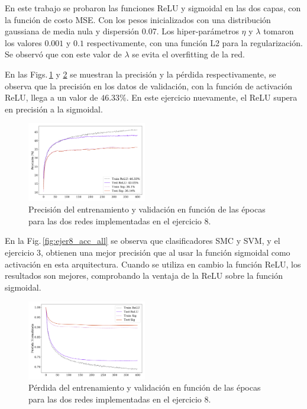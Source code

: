 En este trabajo se probaron las funciones ReLU y sigmoidal en las dos capas, con la función de costo MSE.  Con los pesos inicializados con una distribución gaussiana de media nula y dispersión 0.07. Los hiper-parámetros $\eta$ y $\lambda$ tomaron los valores $0.001$ y $0.1$ respectivamente, con una función L2 para la regularización. Se observó que con este valor de  $\lambda$ se evita el overfitting de la red.

En las Figs.\,\ref{fig:ejer8_acc}  y \ref{fig:ejer8_loss} se muestran la precisión y la pérdida respectivamente, se observa que la precisión en los datos de validación,   con la función de activación ReLU, llega a un valor de $46.33\%$. En este ejercicio nuevamente, el ReLU supera en precisión a la sigmoidal.


\begin{figure}[H]
    \begin{small}
        \begin{center}
            \includegraphics[width=0.465\textwidth]{Graphs/ejer8_acc.pdf}
        \end{center}
        \caption{Precisión del entrenamiento y validación en función de las épocas para las dos redes implementadas en el ejercicio 8.}
        \label{fig:ejer8_acc}
    \end{small}
\end{figure}

En la Fig.\,\ref{fig:ejer8_acc_all} se observa que clasificadores  SMC y SVM, y el ejercicio 3, obtienen una mejor precisión que al usar la función sigmoidal como activación en esta arquitectura. Cuando se utiliza en cambio la función ReLU, los resultados son mejores, comprobando la ventaja de la ReLU sobre la función sigmoidal.

\begin{figure}[H]
    \begin{small}
        \begin{center}
            \includegraphics[width=0.465\textwidth]{Graphs/ejer8_loss.pdf}
        \end{center}
        \caption{Pérdida del entrenamiento  y validación  en función de las épocas para las dos redes implementadas en el ejercicio 8.}
        \label{fig:ejer8_loss}
    \end{small}
\end{figure}


